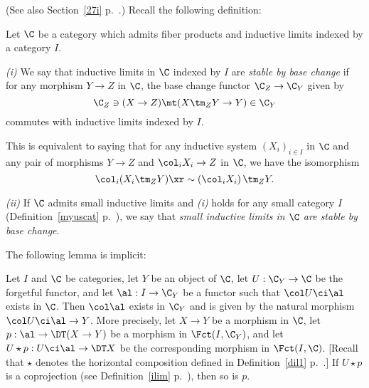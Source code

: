 \documentclass[12pt]{article}
\theoremstyle{remark}
\theoremstyle{definition}
\begin{document}
\begin{s}
(See also Section~\ref{27i} p.~.) Recall the following definition:

\begin{df}
Let $\C$ be a category which admits fiber products and inductive limits indexed by a category $I$.

\nn\emph{(i)} We say that inductive limits in $\C$ indexed by $I$ are \emph{stable by base change} if for any morphism $Y\to Z$ in $\C$, the base change functor $\C_Z\to\C_Y$ given by 
$$
\C_Z\ni(X\to Z)\mt(X\tm_ZY\to Y)\in\C_Y
$$ 
commutes with inductive limits indexed by $I$. 

This is equivalent to saying that for any inductive system $(X_i)_{i\in I}$ in $\C$ and any pair of morphisms $Y\to Z$ and $\col_iX_i\to Z$ in $\C$, we have the isomorphism 
$$
\col_i(X_i\tm_ZY)\xr\sim\left(\col_iX_i\right)\tm_ZY.
$$

\nn\emph{(ii)} If $\C$ admits small inductive limits and \emph{(i)} holds for any small category $I$ (Definition~\ref{myuscat} p.~), we say that \emph{small inductive limits in $\C$ are stable by base change}.
\end{df} 

The following lemma is implicit:

\begin{lem} 
Let $I$ and $\C$ be categories, let $Y$ be an object of $\C$, let $U:\C_Y\to\C$ be the forgetful functor, and let $\al:I\to\C_Y$ be a functor such that $\col U\ci\al$ exists in $\C$. Then $\col\al$ exists in $\C_Y$ and is given by the natural morphism $\col U\ci\al\to Y$. More precisely, let $X\to Y$ be a morphism in $\C$, let $p:\al\to\DT(X\to Y)$ be a morphism in $\Fct(I,\C_Y)$, and let $U\star p:U\ci\al\to\DT X$ be the corresponding morphism in $\Fct(I,\C)$. [Recall that $\star$ denotes the horizontal composition defined in Definition~\ref{dil1} p.~.] If $U\star p$ is a coprojection (see Definition~\ref{ilim} p.~), then so is $p$.
\end{lem}


\end{s}
\end{document}
